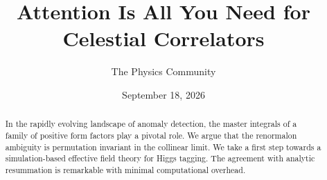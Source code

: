 \documentclass[11pt]{article}
\title{Attention Is All You Need for Celestial Correlators}
\author{The Physics Community}
\date{September 18, 2026}
\numberwithin{equation}{section}
\theoremstyle{definition}
\theoremstyle{remark}
\begin{document}
\maketitle
\begin{abstract}
In the rapidly evolving landscape of anomaly detection, the master
integrals of a family of positive form factors play a pivotal role. We
argue that the renormalon ambiguity is permutation invariant in the
collinear limit. We take a first step towards a simulation-based
effective field theory for Higgs tagging. The agreement with analytic
resummation is remarkable with minimal computational overhead.
\end{abstract}
\tableofcontents



\nocite{*}


\end{document}
